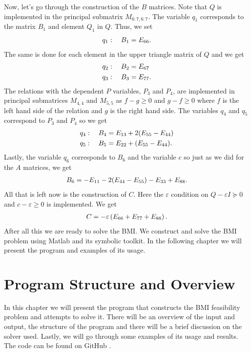 \documentclass[a4paper,12pt,twoside,BCOR=10mm]{scrbook}
\begin{document}
Now, let's go through the construction of the $B$ matrices. Note that $Q$ is implemented in the principal submatrix $M_{6:7, 6:7}$. The variable $q_1$ corresponds to the matrix $B_1$ and element $Q_1$ in $Q$. Thus, we set
\begin{align*}
    q_1: \quad B_1 = E_{66}.
\end{align*}
The same is done for each element in the upper triangle matrix of $Q$ and we get
\begin{align*}
    &q_2: \quad B_2 = E_{67}\\
    &q_3: \quad B_3 = E_{77}.
\end{align*}
The relations with the dependent $P$ variables, $P_3$ and $P_4$, are implemented in principal submatrices $M_{4,4}$ and $M_{5,5}$ as $f - g \geq 0$ and $g - f \geq 0$ where $f$ is the left hand side of the relation and $g$ is the right hand side. 
The variables $q_4$ and $q_5$ correspond to $P_3$ and $P_4$ so we get
\begin{align*}
    &q_4: \quad B_4 = E_{13} + 2(E_{55} - E_{44})\\
    &q_5: \quad B_5 = E_{22} + (E_{55} - E_{44}).
\end{align*}
Lastly, the variable $q_6$ corresponds to $B_6$ and the variable $c$ so just as we did for the $A$ matrices, we get
\begin{align*}
    B_6 = -E_{11} - 2(E_{44} - E_{55}) - E_{33} + E_{88}.
\end{align*}
All that is left now is the construction of $C$. Here the $\varepsilon$ condition on $Q - \varepsilon I \succeq 0$ and $c - \varepsilon \geq 0$ is implemented. We get
\begin{align*}
    C = -\varepsilon\left(E_{66} + E_{77} + E_{88}\right).
\end{align*}
After all this we are ready to solve the BMI. We construct and solve the BMI problem using Matlab and its symbolic toolkit. In the following chapter we will present the program and examples of its usage.



\chapter{Program Structure and Overview}\label{KafliProgramStructure}
In this chapter we will present the program that constructs the BMI feasibility problem and attempts to solve it. There will be an overview of the input and output, the structure of the program and there will be a brief discussion on the solver used. Lastly, we will go through some examples of its usage and results. The code can be found on GitHub \citep{Mverk2022}.
\end{document}
